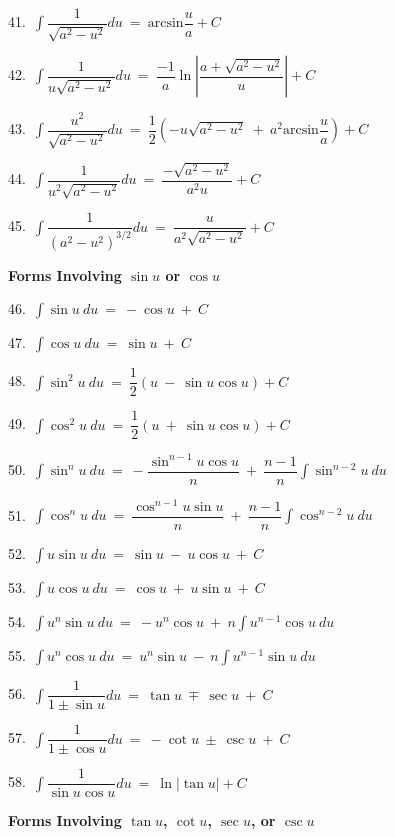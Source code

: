 \documentclass{article}
\begin{document}
\begin{large}
\begin{small}
41.\ $\displaystyle\int \dfrac{1}{\sqrt{a^{2}-u^{2}}}du\ =\ \text{arcsin}\dfrac{u}{a} + C$

42.\ $\displaystyle\int \dfrac{1}{u\sqrt{a^{2}-u^{2}}}du\ =\ \dfrac{-1}{a}\ln\left|\dfrac{a+\sqrt{a^{2}-u^{2}}}{u}\right| + C$

43.\ $\displaystyle\int \dfrac{u^{2}}{\sqrt{a^{2}-u^{2}}}du\ =\ \dfrac{1}{2}\left(-u\sqrt{a^{2}-u^{2}}\ +\ a^{2}\text{arcsin}\dfrac{u}{a}\right) + C$

44.\ $\displaystyle\int \dfrac{1}{u^{2}\sqrt{a^{2}-u^{2}}}du\ =\ \dfrac{-\sqrt{a^{2}-u^{2}}}{a^{2}u} + C$

45.\ $\displaystyle\int \dfrac{1}{(a^{2}-u^{2})^{3/2}}du\ =\ \dfrac{u}{a^{2}\sqrt{a^{2}-u^{2}}} + C$

\textbf{Forms Involving $\sin u$ or $\cos u$}

46.\ $\displaystyle\int \sin u\ du\ =\ -\cos u\ +\ C$

47.\ $\displaystyle\int \cos u\ du\ =\ \sin u\ +\ C$

48.\ $\displaystyle\int \sin^{2} u\ du\ =\ \dfrac{1}{2}(u\ -\ \sin u \cos u) + C$

49.\ $\displaystyle\int \cos^{2} u\ du\ =\ \dfrac{1}{2}(u\ +\ \sin u \cos u) + C$

50.\ $\displaystyle\int \sin^{n} u\ du\ =\ -\dfrac{\sin^{n-1} u \cos u}{n}\ +\ \dfrac{n-1}{n}\displaystyle\int \sin^{n-2} u\ du$

51.\ $\displaystyle\int \cos^{n} u\ du\ =\ \dfrac{\cos^{n-1} u \sin u}{n}\ +\ \dfrac{n-1}{n}\displaystyle\int \cos^{n-2} u\ du$

52.\ $\displaystyle\int u\sin u\ du\ =\ \sin u\ -\ u \cos u\ +\ C$

53.\ $\displaystyle\int u\cos u\ du\ =\ \cos u\ +\ u \sin u\ +\ C$

54.\ $\displaystyle\int u^{n}\sin u\ du\ =\ -u^{n}\cos u\ +\ n\displaystyle\int u^{n-1}\cos u\ du$

55.\ $\displaystyle\int u^{n}\cos u\ du\ =\ u^{n}\sin u\ -\ n\displaystyle\int u^{n-1}\sin u\ du$

56.\ $\displaystyle\int \dfrac{1}{1\pm \sin u}du\ =\ \tan u\ \mp\ \sec u\ +\ C$

57.\ $\displaystyle\int \dfrac{1}{1\pm \cos u}du\ =\ -\cot u\ \pm\ \csc u\ +\ C$

58.\ $\displaystyle\int \dfrac{1}{\sin u \cos u}du\ =\ \ln|\tan u| + C$

\textbf{Forms Involving $\tan u$, $\cot u$, $\sec u$, or $\csc u$}


\end{small}
\end{large}
\end{document}

